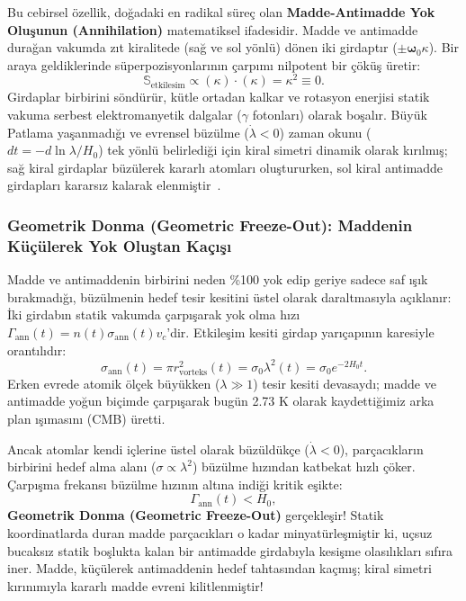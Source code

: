 Bu cebirsel özellik, doğadaki en radikal süreç olan \textbf{Madde-Antimadde Yok Oluşunun (Annihilation)} matematiksel ifadesidir. Madde ve antimadde durağan vakumda zıt kiralitede (sağ ve sol yönlü) dönen iki girdaptır ($\pm \boldsymbol{\omega}_0 \kappa$). Bir araya geldiklerinde süperpozisyonlarının çarpımı nilpotent bir çöküş üretir:
\begin{equation}
    \mathbb{S}_{\mathrm{etkilesim}} \propto (\kappa) \cdot (\kappa) = \kappa^2 \equiv 0.
\end{equation}
Girdaplar birbirini söndürür, kütle ortadan kalkar ve rotasyon enerjisi statik vakuma serbest elektromanyetik dalgalar ($\gamma$ fotonları) olarak boşalır. Büyük Patlama yaşanmadığı ve evrensel büzülme ($\dot{\lambda} < 0$) zaman okunu ($dt = -d\ln\lambda/H_0$) tek yönlü belirlediği için kiral simetri dinamik olarak kırılmış; sağ kiral girdaplar büzülerek kararlı atomları oluştururken, sol kiral antimadde girdapları kararsız kalarak elenmiştir~\cite{haydari_calculus}.

\subsubsection{Geometrik Donma (Geometric Freeze-Out): Maddenin Küçülerek Yok Oluştan Kaçışı}
\label{sec:geometrik_donma_main}
Madde ve antimaddenin birbirini neden \%100 yok edip geriye sadece saf ışık bırakmadığı, büzülmenin hedef tesir kesitini üstel olarak daraltmasıyla açıklanır:
İki girdabın statik vakumda çarpışarak yok olma hızı $\Gamma_{\mathrm{ann}}(t) = n(t) \sigma_{\mathrm{ann}}(t) v_c$'dir. Etkileşim kesiti girdap yarıçapının karesiyle orantılıdır:
\begin{equation}
    \sigma_{\mathrm{ann}}(t) = \pi r_{\mathrm{vorteks}}^2(t) = \sigma_0 \lambda^2(t) = \sigma_0 e^{-2 H_0 t}.
    \label{eq:tesir_kesiti_main}
\end{equation}
Erken evrede atomik ölçek büyükken ($\lambda \gg 1$) tesir kesiti devasaydı; madde ve antimadde yoğun biçimde çarpışarak bugün 2.73 K olarak kaydettiğimiz arka plan ışımasını (CMB) üretti.

Ancak atomlar kendi içlerine üstel olarak büzüldükçe ($\dot{\lambda} < 0$), parçacıkların birbirini hedef alma alanı ($\sigma \propto \lambda^2$) büzülme hızından katbekat hızlı çöker. Çarpışma frekansı büzülme hızının altına indiği kritik eşikte:
\begin{equation}
    \Gamma_{\mathrm{ann}}(t) < H_0,
    \label{eq:donma_kriteri_main}
\end{equation}
\textbf{Geometrik Donma (Geometric Freeze-Out)} gerçekleşir! Statik koordinatlarda duran madde parçacıkları o kadar minyatürleşmiştir ki, uçsuz bucaksız statik boşlukta kalan bir antimadde girdabıyla kesişme olasılıkları sıfıra iner. Madde, küçülerek antimaddenin hedef tahtasından kaçmış; kiral simetri kırınımıyla kararlı madde evreni kilitlenmiştir!

